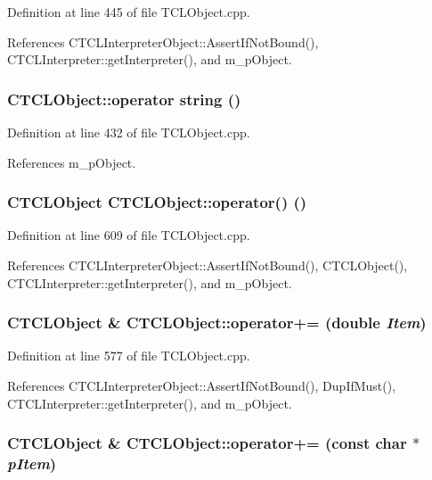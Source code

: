 Definition at line 445 of file TCLObject.cpp.

References CTCLInterpreter\-Object::Assert\-If\-Not\-Bound(), CTCLInterpreter::get\-Interpreter(), and m\_\-p\-Object.
\subsubsection{\setlength{\rightskip}{0pt plus 5cm}CTCLObject::operator string ()}\label{classCTCLObject_a12}




Definition at line 432 of file TCLObject.cpp.

References m\_\-p\-Object.
\subsubsection{\setlength{\rightskip}{0pt plus 5cm}CTCLObject CTCLObject::operator() ()}\label{classCTCLObject_a22}




Definition at line 609 of file TCLObject.cpp.

References CTCLInterpreter\-Object::Assert\-If\-Not\-Bound(), CTCLObject(), CTCLInterpreter::get\-Interpreter(), and m\_\-p\-Object.
\subsubsection{\setlength{\rightskip}{0pt plus 5cm}CTCLObject \& CTCLObject::operator+= (double {\em Item})}\label{classCTCLObject_a20}




Definition at line 577 of file TCLObject.cpp.

References CTCLInterpreter\-Object::Assert\-If\-Not\-Bound(), Dup\-If\-Must(), CTCLInterpreter::get\-Interpreter(), and m\_\-p\-Object.
\subsubsection{\setlength{\rightskip}{0pt plus 5cm}CTCLObject \& CTCLObject::operator+= (const char $\ast$ {\em p\-Item})}\label{classCTCLObject_a19}




